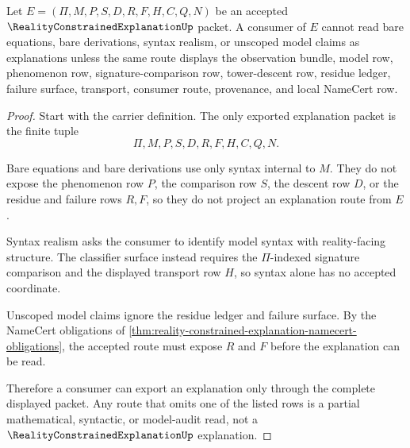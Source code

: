 \begin{theorem}
\label{thm:reality-constrained-explanation-scope-and-residue}
Let $E=(\Pi,M,P,S,D,R,F,H,C,Q,N)$ be an accepted $\RealityConstrainedExplanationUp$ packet. A consumer of $E$ cannot read bare equations, bare derivations, syntax realism, or unscoped model claims as explanations unless the same route displays the observation bundle, model row, phenomenon row, signature-comparison row, tower-descent row, residue ledger, failure surface, transport, consumer route, provenance, and local NameCert row.
\end{theorem}
\begin{proof}
Start with the carrier definition. The only exported explanation packet is the finite tuple
$$
\Pi,M,P,S,D,R,F,H,C,Q,N.
$$

Bare equations and bare derivations use only syntax internal to $M$. They do not expose the phenomenon row $P$, the comparison row $S$, the descent row $D$, or the residue and failure rows $R,F$, so they do not project an explanation route from $E$.

Syntax realism asks the consumer to identify model syntax with reality-facing structure. The classifier surface instead requires the $\Pi$-indexed signature comparison and the displayed transport row $H$, so syntax alone has no accepted coordinate.

Unscoped model claims ignore the residue ledger and failure surface. By the NameCert obligations of \autoref{thm:reality-constrained-explanation-namecert-obligations}, the accepted route must expose $R$ and $F$ before the explanation can be read.

Therefore a consumer can export an explanation only through the complete displayed packet. Any route that omits one of the listed rows is a partial mathematical, syntactic, or model-audit read, not a $\RealityConstrainedExplanationUp$ explanation.
\end{proof}



